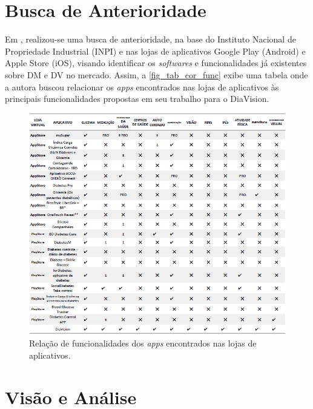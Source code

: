 \section{Busca de Anterioridade}

Em , realizou-se uma busca de anterioridade, na base do Instituto Nacional de Propriedade Industrial (INPI)
e nas lojas de aplicativos Google Play (Android) e Apple Store (iOS), visando identificar os \emph{softwares} e funcionalidades
já existentes sobre DM e DV no mercado.
Assim, a \autoref{fig_tab_cor_func} exibe uma tabela onde a autora buscou relacionar os \emph{apps} encontrados
nas lojas de aplicativos às principais funcionalidades propostas em seu trabalho para o DiaVision.

\begin{figure}[htb]
    \caption{\label{fig_tab_cor_func}Relação de funcionalidades dos \emph{apps} encontrados nas lojas de aplicativos.}
    \begin{center}
        \includegraphics[scale=0.75]{Imagens/proposta/busca_anterioridade.png}
    \end{center}
\end{figure}

\newpage

\section{Visão e Análise}

